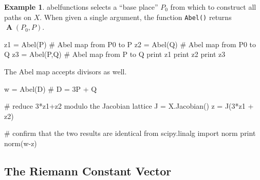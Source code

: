 \documentclass[12pt]{article}
\theoremstyle{definition}
\newtheorem{example}[theorem]{Example}
\DeclareMathOperator{\Abel}{\boldsymbol{A}}
\begin{document}
\begin{example}
{\sc abelfunctions} selects a ``base place'' $P_0$ from which to
construct all paths on $X$. When given a single argument, the function
{\tt Abel()} returns $\Abel(P_0,P)$.
\begin{ipythoninput}
z1 = Abel(P)      # Abel map from P0 to P
z2 = Abel(Q)      # Abel map from P0 to Q
z3 = Abel(P,Q)    # Abel map from P to Q
print z1
print z2
print z3
\end{ipythoninput}
\begin{ipythonoutput}
[XXX]
[XXX]
[XXX]
\end{ipythonoutput}
The Abel map accepts divisors as well.
\begin{ipythoninput}
w = Abel(D)    # D = 3P + Q

# reduce 3*z1+z2 modulo the Jacobian lattice
J = X.Jacobian()
z = J(3*z1 + z2)

# confirm that the two results are identical
from scipy.linalg import norm
print norm(w-z)
\end{ipythoninput}
\begin{ipythonoutput}
[XXX]
\end{ipythonoutput}

\end{example}



\subsection{The Riemann Constant Vector}
\end{document}
